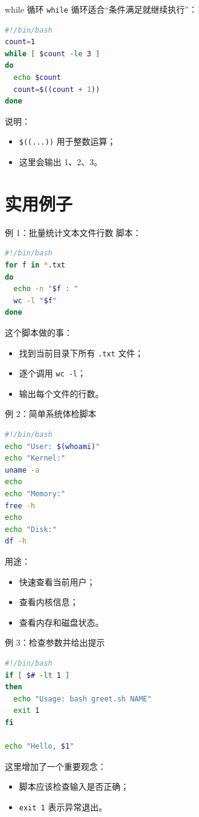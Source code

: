 \documentclass[aspectratio=169]{beamer}
\begin{document}
\begin{frame}[fragile]{while 循环}
\texttt{while} 循环适合“条件满足就继续执行”：

\begin{lstlisting}[language=bash]
#!/bin/bash
count=1
while [ $count -le 3 ]
do
  echo $count
  count=$((count + 1))
done
\end{lstlisting}

说明：
\begin{itemize}
  \item \texttt{\$((...))} 用于整数运算；
  \item 这里会输出 1、2、3。
\end{itemize}
\end{frame}

\section{实用例子}

\begin{frame}[fragile]{例 1：批量统计文本文件行数}
脚本：
\begin{lstlisting}[language=bash]
#!/bin/bash
for f in *.txt
do
  echo -n "$f : "
  wc -l "$f"
done
\end{lstlisting}

这个脚本做的事：
\begin{itemize}
  \item 找到当前目录下所有 \texttt{.txt} 文件；
  \item 逐个调用 \texttt{wc -l}；
  \item 输出每个文件的行数。
\end{itemize}
\end{frame}

\begin{frame}[fragile]{例 2：简单系统体检脚本}
\begin{lstlisting}[language=bash]
#!/bin/bash
echo "User: $(whoami)"
echo "Kernel:"
uname -a
echo
echo "Memory:"
free -h
echo
echo "Disk:"
df -h
\end{lstlisting}

用途：
\begin{itemize}
  \item 快速查看当前用户；
  \item 查看内核信息；
  \item 查看内存和磁盘状态。
\end{itemize}
\end{frame}

\begin{frame}[fragile]{例 3：检查参数并给出提示}
\begin{lstlisting}[language=bash]
#!/bin/bash
if [ $# -lt 1 ]
then
  echo "Usage: bash greet.sh NAME"
  exit 1
fi

echo "Hello, $1"
\end{lstlisting}

这里增加了一个重要观念：
\begin{itemize}
  \item 脚本应该检查输入是否正确；
  \item \texttt{exit 1} 表示异常退出。
\end{itemize}
\end{frame}
\end{document}
